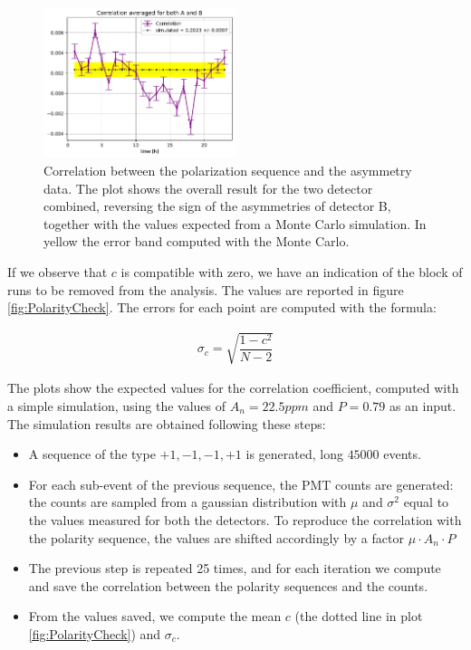 \begin{figure}[!ht]
\centering
\includegraphics[width = 0.5\textwidth]{Analysis/Dataselection/OverallCorr.pdf}
\caption{Correlation between the polarization sequence and the asymmetry data. The plot shows the overall result for the two detector combined, reversing the sign of the asymmetries of detector B, together with the values expected from a Monte Carlo simulation. In yellow the error band computed with the Monte Carlo.}
\label{fig:PolarityCheck2}
\end{figure}

If we observe that $c$ is compatible with zero, we have an indication of the block of runs to be removed from the analysis.
The values are reported in figure \ref{fig:PolarityCheck}. The errors for each point are computed with the formula:

\begin{align*}
\sigma_{c} = \sqrt{\dfrac{1 - c^{2}}{N - 2}}
\end{align*} 

The plots show the expected values for the correlation coefficient, computed with a simple simulation, using the values of $A_{n} = 22.5 ppm$ and $P = 0.79$ as an input. The simulation results are obtained following these steps:

\begin{itemize}
\item A sequence of the type $+1,-1,-1,+1$ is generated, long $45000$ events.
\item For each sub-event of the previous sequence, the PMT counts are generated: the counts are sampled from a gaussian distribution with $\mu$ and $\sigma^{2}$ equal to the values measured for both the detectors. To reproduce the correlation with the polarity sequence, the values are shifted accordingly  by a factor $\mu \cdot A_{n} \cdot P$  
\item The previous step is repeated 25 times, and for each iteration we compute and save the correlation between the polarity sequences and the counts.
\item From the values saved, we compute the mean $c$ (the dotted line in plot \ref{fig:PolarityCheck}) and $\sigma_{c}$.
\end{itemize}

